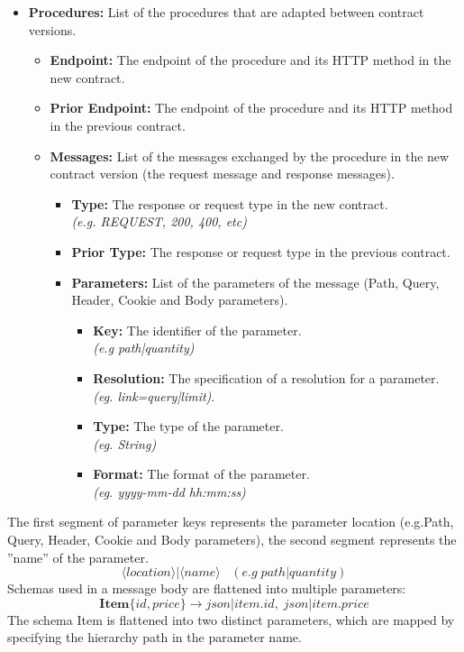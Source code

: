 \begin{itemize}
    \setlength\itemsep{0em}
    \item \textbf{Procedures:} List of the procedures that are adapted between contract versions.
    \begin{itemize}
        \setlength\itemsep{0em}
        \item \textbf{Endpoint:} The endpoint of the procedure and its HTTP method in the new contract.
        \item \textbf{Prior Endpoint:} The endpoint of the procedure and its HTTP method in the previous contract.
        \item \textbf{Messages:}  List of the messages exchanged by the procedure in the new contract version (the request message and response messages).
        \begin{itemize}
            \setlength\itemsep{0em}
            \item \textbf{Type:} The response or request type in the new contract. \\\textit{(e.g. REQUEST, 200, 400, etc)}
            \item \textbf{Prior Type:} The response or request type in the previous contract.
            \item \textbf{Parameters:} List of the parameters of the message (Path, Query, Header, Cookie and Body parameters).
            \begin{itemize}
                \setlength\itemsep{0em}
                \item \textbf{Key:}  The identifier of the parameter. \\\textit{(e.g path|quantity)}
                \item \textbf{Resolution:} The specification of a resolution for a parameter. \\\textit{(eg. link=query|limit)}.
                \item \textbf{Type:} The type of the parameter. \\\textit{(eg. String)}
                \item \textbf{Format:} The format of the parameter. \\\textit{(eg. yyyy-mm-dd hh:mm:ss)}
            \end{itemize}
        \end{itemize}
    \end{itemize}
\end{itemize}

The first segment of parameter keys represents the parameter location (e.g.Path, Query, Header, Cookie and Body parameters), the second segment represents the ''name'' of the parameter.
\[ \langle location\rangle |\langle name\rangle \;\;\;(e.g\;path|quantity) \]
Schemas used in a message body are flattened into multiple parameters:
\[ \mathbf{Item}\bm{\{}id,price\bm{\}} \rightarrow json|item.id,\;json|item.price \]
The schema Item is flattened into two distinct parameters, which are mapped by specifying the hierarchy path in the parameter name.

